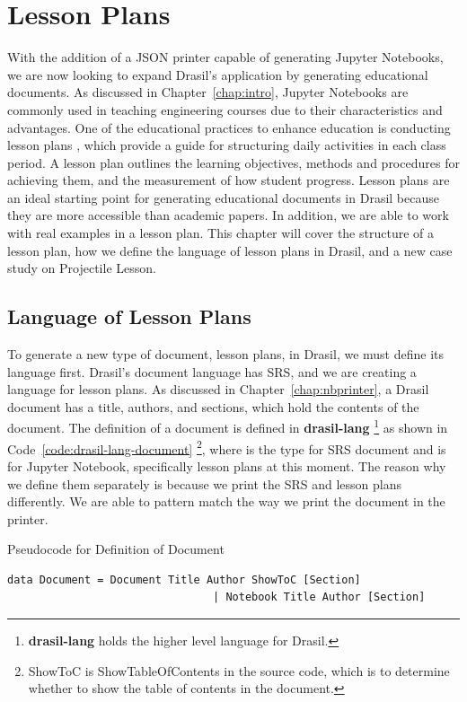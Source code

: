 \chapter{Lesson Plans} \label{chap:casestudy}
With the addition of a JSON printer capable of generating Jupyter Notebooks, we 
are now looking to expand Drasil's application by generating educational 
documents. As discussed in Chapter~\ref{chap:intro}, Jupyter Notebooks are 
commonly used in teaching engineering courses due to their characteristics and 
advantages. One of the educational practices to enhance education is conducting 
lesson plans \cite{cicek2013effective, wong2018first}, which provide a 
guide for structuring daily activities in each class period. A lesson plan 
outlines the learning objectives, methods and procedures for achieving them, 
and the measurement of how student progress. Lesson plans are an ideal starting 
point for generating educational documents in Drasil because they are more 
accessible than academic papers. In addition, we are able to work with real 
examples in a lesson plan. This chapter will cover the structure of a lesson 
plan, how we define the language of lesson plans in Drasil, and a new case 
study on Projectile Lesson.

\section{Language of Lesson Plans} \label{chap:lessonLang}
To generate a new type of document, lesson plans, in Drasil, we must define its 
language first. Drasil's document language has SRS, and we are creating a 
language for lesson plans. As discussed in Chapter~\ref{chap:nbprinter}, a 
Drasil document has a title, authors, and sections, which hold the contents 
of the document. The definition of a document is defined in 
\textbf{drasil-lang} \footnote{\textbf{drasil-lang} holds the higher level 
language for Drasil.} as shown in Code~\ref{code:drasil-lang-document} 
\footnote{ShowToC is ShowTableOfContents in the source code, which is to 
determine whether to show the table of contents in the document.}, where 
 is the type for SRS document and  is for 
Jupyter Notebook, specifically lesson plans at this moment. The reason why we 
define them separately is because we print the SRS and lesson plans 
differently. We are able to pattern match the way we print the document in the 
printer.

\begin{listing}[h]
	\caption{Pseudocode for Definition of Document}
	\label{code:drasil-lang-document}
	\begin{lstlisting}[language=haskell1]
	data Document = Document Title Author ShowToC [Section]
								| Notebook Title Author [Section]
	\end{lstlisting}
\end{listing}


